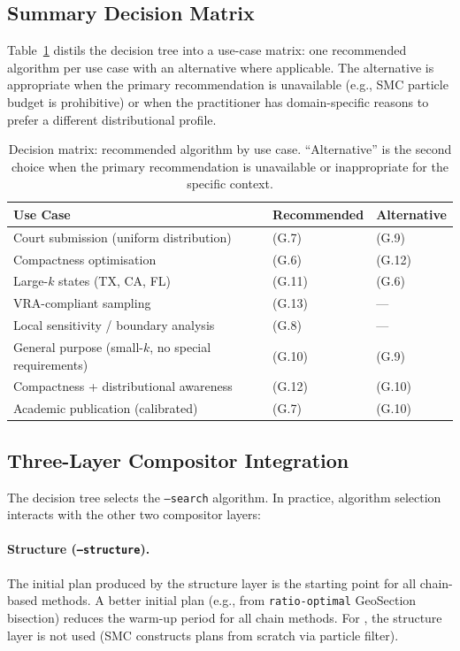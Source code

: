 \subsection{Summary Decision Matrix}

Table~\ref{tab:decision} distils the decision tree into a use-case matrix:
one recommended algorithm per use case with an alternative where applicable.
The alternative is appropriate when the primary recommendation is unavailable
(e.g., SMC particle budget is prohibitive) or when the practitioner has
domain-specific reasons to prefer a different distributional profile.

\begin{table}[ht]
\centering
\caption{%
  Decision matrix: recommended algorithm by use case.
  ``Alternative'' is the second choice when the primary recommendation
  is unavailable or inappropriate for the specific context.
}
\label{tab:decision}
\begin{tabular}{@{}lll@{}}
\toprule
Use Case & Recommended & Alternative \\
\midrule
Court submission (uniform distribution)
  & \smc{} (G.7) & \fr{} (G.9) \\
Compactness optimisation
  & \sburst{} (G.6) & \sburstf{} (G.12) \\
Large-$k$ states (TX, CA, FL)
  & \ms{} (G.11) & \sburst{} (G.6) \\
VRA-compliant sampling
  & \vra{} (G.13) & --- \\
Local sensitivity / boundary analysis
  & \flip{} (G.8) & --- \\
General purpose (small-$k$, no special requirements)
  & \msp{} (G.10) & \fr{} (G.9) \\
Compactness + distributional awareness
  & \sburstf{} (G.12) & \msp{} (G.10) \\
Academic publication (calibrated)
  & \smc{} (G.7) & \msp{} (G.10) \\
\bottomrule
\end{tabular}
\end{table}

\subsection{Three-Layer Compositor Integration}

The decision tree selects the \texttt{--search} algorithm.
In practice, algorithm selection interacts with the other two compositor
layers:

\paragraph{Structure (\texttt{--structure}).}
The initial plan produced by the structure layer is the starting point for
all chain-based methods.
A better initial plan (e.g., from \texttt{ratio-optimal} GeoSection
bisection) reduces the warm-up period for all chain methods.
For \smc{}, the structure layer is not used (SMC constructs plans from
scratch via particle filter).

